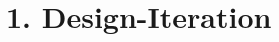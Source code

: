 \documentclass[.../Dokumentation.tex]{subfiles}
\begin{document}
    \section{1. Design-Iteration}\label{sec-ita1}
\end{document}
